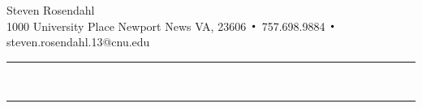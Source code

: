 \documentclass{hw}
\DeclareMathOperator*{\Bigcdot}{\scalerel*{\cdot}{\bigodot}}
\begin{document}
\noindent
\begin{center}
{\huge Steven Rosendahl}\\
{\small 1000 University Place Newport News VA, 23606 $\Bigcdot$ 757.698.9884 $\Bigcdot$
steven.rosendahl.13@cnu.edu}\\
\end{center}
\hrule
\noindent \\

\hrule
\noindent \\

\end{document}
